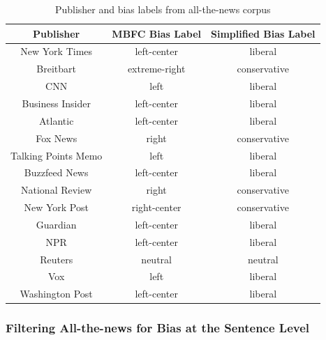 \documentclass[10pt,a4paper,onecolumn]{article}
\begin{document}
\begin{table}[h!]
	\begin{center}
		\caption{Publisher and bias labels from all-the-news corpus}
		\label{tab:pub-bias}
		\begin{tabular}{c|c|c}
			\hline\hline
			\textbf{Publisher} & \textbf{MBFC Bias Label} & \textbf{Simplified Bias Label} \\
			\hline
			New York Times & left-center & liberal \\
			\rowcolor{Gray}
			Breitbart & extreme-right & conservative \\
			\rowcolor{Gray}
			CNN & left & liberal \\
			Business Insider & left-center & liberal \\
			Atlantic & left-center & liberal \\
			\rowcolor{Gray}
			Fox News & right & conservative \\
			\rowcolor{Gray}
			Talking Points Memo & left & liberal \\
			Buzzfeed News & left-center & liberal \\
			National Review & right & conservative \\
			New York Post & right-center & conservative \\
			Guardian & left-center & liberal \\
			NPR & left-center & liberal \\
			\rowcolor{Gray}
			Reuters & neutral & neutral \\
			\rowcolor{Gray}
			Vox & left & liberal \\
			Washington Post & left-center & liberal \\
			\hline\hline
		\end{tabular}
	\end{center}
\end{table}

\subsubsection{Filtering All-the-news for Bias at the Sentence Level}
\label{sec:filtering2}
\end{document}
